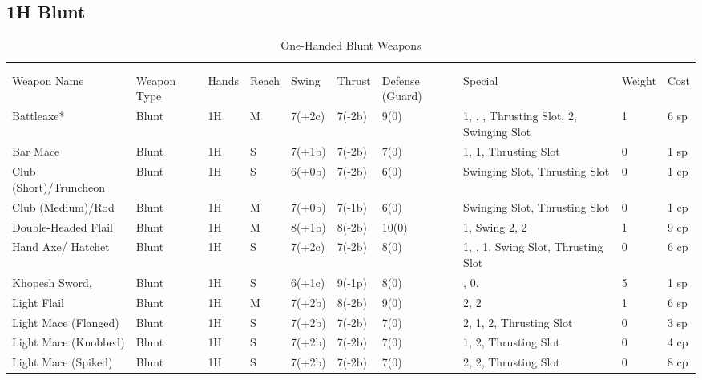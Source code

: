 \documentclass[oneside,11pt,english]{book}
\begin{document}
\subsection{1H Blunt}\vspace{-15pt}
\begin{longtabu} to 1\linewidth {X[2,l]XX[-1,c]X[-1,c]XXX[-1,c]X[2,l]X[-3,c]X[-3,r]}
	\captionsetup{labelformat=blank,textformat=empty}
	\caption{One-Handed Blunt Weapons}\vspace{-15pt}\\
	\label{tab:1H Blunt}\\\endfirsthead
Weapon Name						&Weapon Type	&Hands&Reach&Swing&Thrust&Defense (Guard)&Special						&Weight	&Cost\\\toprule\endhead
Battleaxe* &Blunt &1H &M &7(+2c) &7(-2b) &9(0)&  1, , , Thrusting Slot,  2, Swinging Slot &1 &6 sp\\
Bar Mace &Blunt &1H &S &7(+1b) &7(-2b) &7(0)&  1,  1, Thrusting Slot &0 &1 sp\\
Club (Short)/Truncheon &Blunt &1H &S &6(+0b) &7(-2b) &6(0)& Swinging Slot, Thrusting Slot &0 &1 cp\\
Club (Medium)/Rod &Blunt &1H &M &7(+0b) &7(-1b) &6(0)& Swinging Slot, Thrusting Slot &0 &1 cp\\
Double-Headed Flail &Blunt &1H &M &8(+1b) &8(-2b) &10(0)&  1,  Swing 2,  2 &1 &9 cp\\
Hand Axe/ Hatchet &Blunt &1H &S &7(+2c) &7(-2b) &8(0)&  1, ,  1, Swing Slot, Thrusting Slot &0 &6 cp\\
Khopesh Sword, &Blunt &1H &S &6(+1c) &9(-1p) &8(0)& ,  0.&5 &1 sp\\
Light Flail &Blunt &1H &M &7(+2b) &8(-2b) &9(0)&  2,  2 &1 &6 sp\\
Light Mace (Flanged) &Blunt &1H &S &7(+2b) &7(-2b) &7(0)&  2,  1,  2, Thrusting Slot &0 &3 sp\\
Light Mace (Knobbed) &Blunt &1H &S &7(+2b) &7(-2b) &7(0)&  1,  2, Thrusting Slot &0 &4 cp\\
Light Mace (Spiked) &Blunt &1H &S &7(+2b) &7(-2b) &7(0)&  2,  2, Thrusting Slot &0 &8 cp\\

\end{longtabu}
\end{document}

